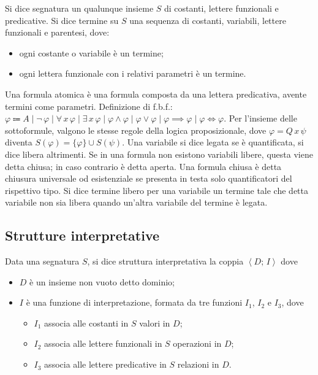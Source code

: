 \documentclass[10pt]{article}
\begin{document}
        Si dice segnatura un qualunque insieme \(S\) di costanti, lettere funzionali e predicative. Si dice termine su \(S\) una
        sequenza di costanti, variabili, lettere funzionali e parentesi, dove:
        \begin{itemize}
            \item ogni costante o variabile è un termine;
            \item ogni lettera funzionale con i relativi parametri è un termine.
        \end{itemize}
        Una formula atomica è una formula composta da una lettera predicativa, avente termini come parametri.
        Definizione di f.b.f.: \(\varphi \Coloneqq A \; | \; \neg \, \varphi \; | \; \forall \, x \, \varphi \; | \; \exists \, x \, \varphi \; | \; \varphi \land \varphi \; | \; \varphi \lor \varphi \; | \; \varphi \implies \varphi \; | \; \varphi \iff \varphi\).
        Per l'insieme delle sottoformule, valgono le stesse regole della logica proposizionale, dove
        \(\varphi = Q \, x \, \psi\) diventa \(S(\varphi) = \{\varphi\} \cup S(\psi)\).
        Una variabile si dice legata se è quantificata, si dice libera altrimenti. Se in una formula non esistono variabili libere,
        questa viene detta chiusa; in caso contrario è detta aperta. Una formula chiusa è detta chiusura universale od esistenziale se
        presenta in testa solo quantificatori del rispettivo tipo. Si dice termine libero per una variabile un termine tale che detta
        variabile non sia libera quando un'altra variabile del termine è legata.

        \subsection*{Strutture interpretative}

            Data una segnatura \(S\), si dice struttura interpretativa la coppia \(\left<D; \, I\right>\) dove
            \begin{itemize}
                \item \(D\) è un insieme non vuoto detto dominio;
                \item \(I\) è una funzione di interpretazione, formata da tre funzioni \(I_1\), \(I_2\) e \(I_3\), dove
                    \begin{itemize}
                        \item \(I_1\) associa alle costanti in \(S\) valori in \(D\);
                        \item \(I_2\) associa alle lettere funzionali in \(S\) operazioni in \(D\);
                        \item \(I_3\) associa alle lettere predicative in \(S\) relazioni in \(D\).
                    \end{itemize}
            \end{itemize}
\end{document}
